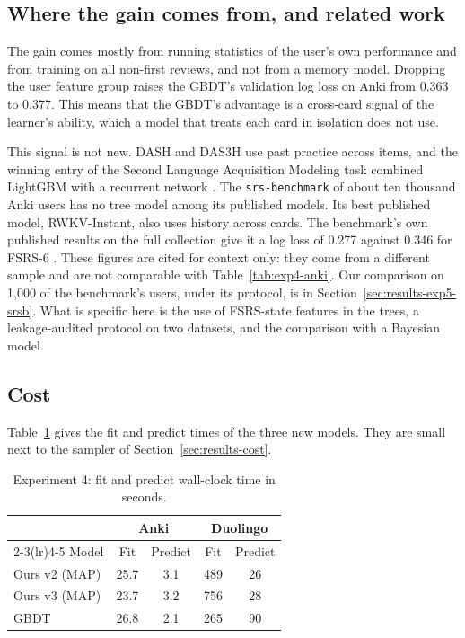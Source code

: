\subsection{Where the gain comes from, and related work}
\label{sec:results-exp4-source}

The gain comes mostly from running statistics of the user's own performance and from training on all non-first reviews, and not from a memory model. Dropping the user feature group raises the GBDT's validation log loss on Anki from 0.363 to 0.377. This means that the GBDT's
advantage is a cross-card signal of the learner's ability, which a model that treats each card in isolation does not use.

This signal is not new. DASH \cite{lindsey2014improving} and DAS3H \cite{choffin2019das3h} use past practice across items, and
the winning entry of the Second Language Acquisition Modeling task combined LightGBM with a recurrent network \cite{settles2018slam,osika2018slam}. The \texttt{srs-benchmark} of about ten thousand Anki users \cite{srsbenchmark}
has no tree model among its published models. Its best published model, RWKV-Instant, also uses history across cards. The benchmark's own published results on the full collection give it a log loss of 0.277 against 0.346 for FSRS-6 \cite{srsbenchmark}. These figures are cited for context only: they come from a different sample and are not comparable with Table~\ref{tab:exp4-anki}. Our comparison on 1,000 of the benchmark's users, under its protocol, is in Section~\ref{sec:results-exp5-srsb}. What is specific here is the use of FSRS-state features in the trees, a leakage-audited protocol on two datasets, and the comparison with a Bayesian model.

\subsection{Cost}
\label{sec:results-exp4-cost}

Table~\ref{tab:exp4-cost} gives the fit and predict times of the three new models. They are small next to the sampler of Section~\ref{sec:results-cost}.

\begin{table}[htbp]
  \centering
  \caption[Experiment 4: fit and predict times]{Experiment 4: fit and predict wall-clock time in seconds.}
  \label{tab:exp4-cost}
  \begin{tabular}{@{}lcccc@{}}
    \toprule
    & \multicolumn{2}{c}{Anki} & \multicolumn{2}{c}{Duolingo} \\
    \cmidrule(lr){2-3}\cmidrule(lr){4-5}
    Model & Fit & Predict & Fit & Predict \\
    \midrule
    Ours v2 (MAP) & 25.7 & 3.1 & 489 & 26 \\
    Ours v3 (MAP) & 23.7 & 3.2 & 756 & 28 \\
    GBDT & 26.8 & 2.1 & 265 & 90 \\
    \bottomrule
  \end{tabular}
\end{table}

